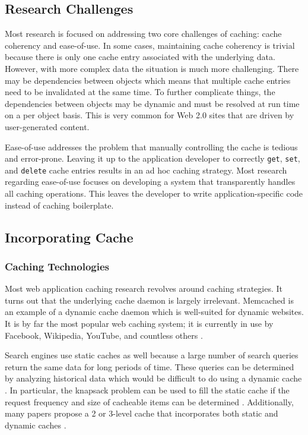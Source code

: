 \documentclass[12pt]{ucthesis}
\begin{document}
\subsection{Research Challenges}
Most research is focused on addressing two core challenges of caching: cache coherency and ease-of-use.
In some cases, maintaining cache coherency is trivial because there is only one cache entry associated with the underlying data.
However, with more complex data the situation is much more challenging.
There may be dependencies between objects which means that multiple cache entries need to be invalidated at the same time.
To further complicate things, the dependencies between objects may be dynamic and must be resolved at run time on a per object basis.
This is very common for Web 2.0 sites that are driven by user-generated content.

Ease-of-use addresses the problem that manually controlling the cache is tedious and error-prone.
Leaving it up to the application developer to correctly {\tt get}, {\tt set}, and {\tt delete} cache entries results in an ad hoc caching strategy.
Most research regarding ease-of-use focuses on developing a system that transparently handles all caching operations.
This leaves the developer to write application-specific code instead of caching boilerplate.

\subsection{Incorporating Cache}
\subsubsection{Caching Technologies}
Most web application caching research revolves around caching strategies.
It turns out that the underlying cache daemon is largely irrelevant.
\textsf{Memcached} is an example of a dynamic cache daemon which is well-suited for dynamic websites.
It is by far the most popular web caching system; it is currently in use by \textsf{Facebook}, \textsf{Wikipedia}, \textsf{YouTube}, and countless others \cite{memcachedDotOrg}.

Search engines use static caches as well because a large number of search queries return the same data for long periods of time.
These queries can be determined by analyzing historical data which would be difficult to do using a dynamic cache \cite{designTradeOffsSearchEngine}.
In particular, the knapsack problem can be used to fill the static cache if the request frequency and size of cacheable items can be determined \cite{designTradeOffsSearchEngine}.
Additionally, many papers propose a 2 or 3-level cache that incorporates both static and dynamic caches \cite{cacheAdmissionPolicies, designTradeOffsSearchEngine}.
\end{document}
